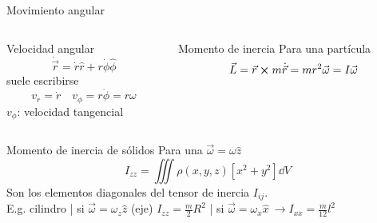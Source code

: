 \documentclass[serif]{beamer}
\begin{document}
\begin{frame}{Movimiento angular}
\begin{columns}[c]
	\begin{column}{0.45\textwidth}
		\begin{block}{Velocidad angular}
		\[
			\dot{\vec{r}} = \dot{r} \hat{r} + r \dot{\phi} \hat{\phi}
		\]
		suele escribirse
		\[
			v_r = \dot{r} \quad v_\phi = r \dot{\phi} = r \omega
		\]
		\(v_\phi\): velocidad tangencial
		\end{block}
	\end{column}

	\pause

	\begin{column}{0.45\textwidth}
		\begin{block}{Momento de inercia}
			Para una partícula
			\[
				\vec{L}= \vec{r} \cp m \dot{\vec{r}} = m r^2 \vec{\omega} = I \vec{\omega}
			\]
		\end{block}
	\end{column}
\end{columns}
	
	\pause
	\begin{block}{Momento de inercia de sólidos}
		Para una \(\vec{\omega}= \omega \hat{z}\)
		\[
			I_{zz}= \iiint \rho(x,y,z) \left[ x^2+y^2 \right] \dd{V}
		\]
		Son los elementos diagonales del tensor de inercia \(I_{ij}\).\\
		\pause
		E.g. cilindro | si \(\vec{\omega}= \omega_z \hat{z}\) (eje) \(I_{zz}= \frac{m}{2}R^2\) | si \(\vec{\omega}= \omega_x \hat{x}\ \rightarrow I_{xx}= \frac{m}{12} l^2\)
	\end{block}

\end{frame}
\end{document}
